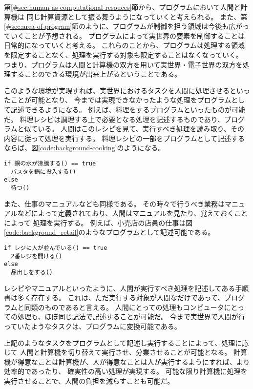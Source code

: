 第\ref{#sec:human-as-computational-resouces}節から、プログラムにおいて人間と計算機は
同じ計算資源として振る舞うようになっていくと考えられる。
また、第\ref{#sec:area-of-program}節のように、プログラムが制御を担う領域は今後も広がっていくことが予想される。
プログラムによって実世界の要素を制御することは日常的になっていくと考える。
これらのことから、プログラムは処理する領域を限定することなく、処理を実行する対象も限定することはなくなっていく。
つまり、プログラムは人間と計算機の双方を用いて実世界・電子世界の双方を処理することのできる環境が出来上がるということである。

このような環境が実現すれば、実世界におけるタスクを人間に処理させるといったことが可能となり、
今までは実現できなかったような処理をプログラムとして記述できるようになる。
例えば、料理をするプログラムといったものが可能だ。
料理レシピは調理する上で必要となる処理を記述するものであり、プログラムと似ている。
人間はこのレシピを見て、実行すべき処理を読み取り、その内容に従って処理を実行する。
料理レシピの一部をプログラムとして記述するならば、図\ref{code:background-cooking}のようになる。

\begin{lstlisting}[caption=料理レシピの一部をプログラム風に記述する, label=code:background-cooking]
if 鍋の水が沸騰する() == true
  パスタを鍋に投入する()
else
  待つ()
\end{lstlisting}

また、仕事のマニュアルなども同様である。
その時々で行うべき業務はマニュアルなどによって定義されており、人間はマニュアルを見たり、覚えておくことによって
処理を実行する。
例えば、小売店の店員の仕事は図\ref{code:background_retail}のようなプログラムとして記述可能である。

\begin{lstlisting}[caption=小売店の店員の挙動の一部をプログラム風に記述する, label=code:background-retail]
if レジに人が並んでいる() == true
  2番レジを開ける()
else
  品出しをする()
\end{lstlisting}

レシピやマニュアルといったように、人間が実行すべき処理を記述してある手順書は多く存在する。
これは、ただ実行する対象が人間なだけであって、プログラムと同類のものであると言える。
人間にとっての処理もコンピュータにとっての処理も、ほぼ同じ記法で記述することが可能だ。
今まで実世界で人間が行っていたようなタスクは、プログラムに変換可能である。

上記のようなタスクをプログラムとして記述し実行することによって、処理に応じて
人間と計算機を切り替えて実行させ、分業させることが可能となる。
計算機が得意なことは計算機が、人が得意なことは人が実行するようにすれば、より効率的であったり、
確実性の高い処理が実現する。
可能な限り計算機に処理を実行させることで、人間の負担を減らすことも可能だ。

